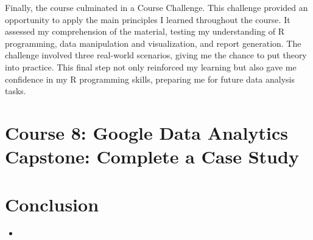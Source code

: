 \documentclass[]{article}
\begin{document}
Finally, the course culminated in a Course Challenge. This challenge provided an opportunity to apply the main principles I learned throughout the course. It assessed my comprehension of the material, testing my understanding of R programming, data manipulation and visualization, and report generation. The challenge involved three real-world scenarios, giving me the chance to put theory into practice. This final step not only reinforced my learning but also gave me confidence in my R programming skills, preparing me for future data analysis tasks.

\section{Course 8: Google Data Analytics Capstone: Complete a Case Study}


\section{Conclusion}
\begin{itemize}
  \item
\end{itemize}
\end{document}
